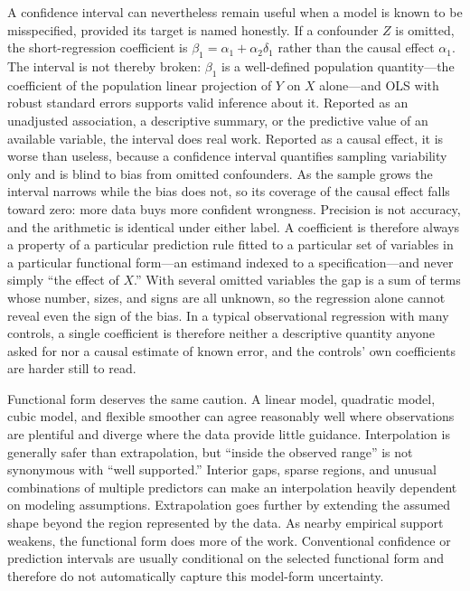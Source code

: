 \documentclass[11pt]{report}
\begin{document}
A confidence interval can nevertheless remain useful when a model is known to be misspecified, provided its target is named honestly. If a confounder \(Z\) is omitted, the short-regression coefficient is \(\beta_1=\alpha_1+\alpha_2\delta_1\) rather than the causal effect \(\alpha_1\). The interval is not thereby broken: \(\beta_1\) is a well-defined population quantity---the coefficient of the population linear projection of \(Y\) on \(X\) alone---and OLS with robust standard errors supports valid inference about it. Reported as an unadjusted association, a descriptive summary, or the predictive value of an available variable, the interval does real work. Reported as a causal effect, it is worse than useless, because a confidence interval quantifies sampling variability only and is blind to bias from omitted confounders. As the sample grows the interval narrows while the bias does not, so its coverage of the causal effect falls toward zero: more data buys more confident wrongness. Precision is not accuracy, and the arithmetic is identical under either label. A coefficient is therefore always a property of a particular prediction rule fitted to a particular set of variables in a particular functional form---an estimand indexed to a specification---and never simply ``the effect of \(X\).'' With several omitted variables the gap is a sum of terms whose number, sizes, and signs are all unknown, so the regression alone cannot reveal even the sign of the bias. In a typical observational regression with many controls, a single coefficient is therefore neither a descriptive quantity anyone asked for nor a causal estimate of known error, and the controls' own coefficients are harder still to read.

Functional form deserves the same caution. A linear model, quadratic model, cubic model, and flexible smoother can agree reasonably well where observations are plentiful and diverge where the data provide little guidance. Interpolation is generally safer than extrapolation, but ``inside the observed range'' is not synonymous with ``well supported.'' Interior gaps, sparse regions, and unusual combinations of multiple predictors can make an interpolation heavily dependent on modeling assumptions. Extrapolation goes further by extending the assumed shape beyond the region represented by the data. As nearby empirical support weakens, the functional form does more of the work. Conventional confidence or prediction intervals are usually conditional on the selected functional form and therefore do not automatically capture this model-form uncertainty.
\end{document}
